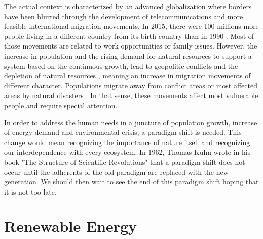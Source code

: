 The actual context is characterized by an advanced globalization where borders have been blurred through the development of telecommunications and  more feasible international migration movements. In 2015, there were 100 millions more people living in a different country from its birth country than in 1990 \cite*{IOM}. Most of those movements are related to work opportunities or family issues. However, the increase in population and the rising demand for natural resources to support a system based on the continuous growth, lead to geopolitic conflicts and the depletion of natural resources \cite*{Rosa2012,commoner1991}, meaning an increase in migration movements of different character. Populations migrate away from conflict areas or most affected areas by natural disasters \cite*{IOM}. In that sense, these movements affect most vulnerable people and require special attention.

In order to address the human needs in a juncture of population growth, increase of energy demand and environmental crisis, a paradigm shift is needed. This change would mean recognizing the importance of nature itself and recognizing our interdependence with every ecosystem. In 1962, Thomas Kuhn wrote in his book  "The Structure of Scientific Revolutions" that a paradigm shift does not occur until the adherents of the old paradigm are replaced with the new generation. We should then wait to see the end of this paradigm shift hoping that it is not too late.

\section{Renewable Energy}


 

